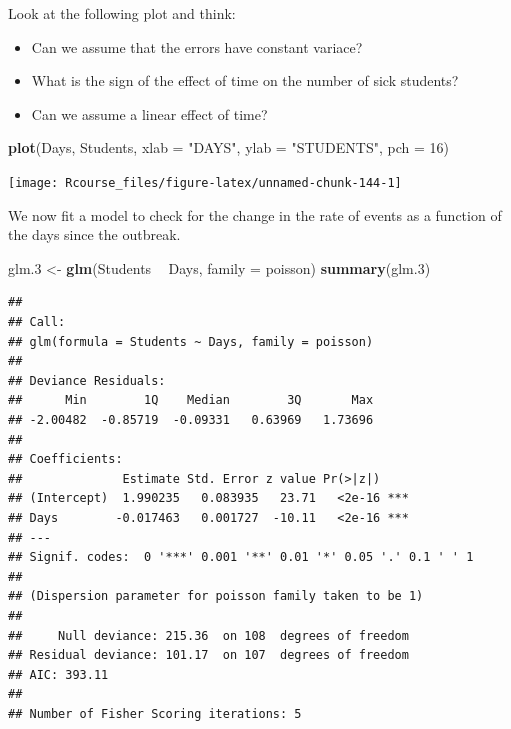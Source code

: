 \documentclass[]{book}
\newenvironment{Shaded}{\begin{snugshade}}{\end{snugshade}}
\newcommand{\KeywordTok}[1]{\textcolor[rgb]{0.13,0.29,0.53}{\textbf{#1}}}
\newcommand{\DataTypeTok}[1]{\textcolor[rgb]{0.13,0.29,0.53}{#1}}
\newcommand{\DecValTok}[1]{\textcolor[rgb]{0.00,0.00,0.81}{#1}}
\newcommand{\StringTok}[1]{\textcolor[rgb]{0.31,0.60,0.02}{#1}}
\newcommand{\OperatorTok}[1]{\textcolor[rgb]{0.81,0.36,0.00}{\textbf{#1}}}
\newcommand{\NormalTok}[1]{#1}
\providecommand{\tightlist}{%
  \setlength{\itemsep}{0pt}\setlength{\parskip}{0pt}}
\theoremstyle{definition}
\theoremstyle{definition}
\theoremstyle{definition}
\theoremstyle{remark}
\begin{document}
Look at the following plot and think:

\begin{itemize}
\tightlist
\item
  Can we assume that the errors have constant variace?
\item
  What is the sign of the effect of time on the number of sick students?
\item
  Can we assume a linear effect of time?
\end{itemize}

\begin{Shaded}
\begin{Highlighting}[]
\KeywordTok{plot}\NormalTok{(Days, Students, }\DataTypeTok{xlab =} \StringTok{"DAYS"}\NormalTok{, }\DataTypeTok{ylab =} \StringTok{"STUDENTS"}\NormalTok{, }\DataTypeTok{pch =} \DecValTok{16}\NormalTok{)}
\end{Highlighting}
\end{Shaded}

\texttt{[image: Rcourse\_files/figure-latex/unnamed-chunk-144-1]}

We now fit a model to check for the change in the rate of events as a
function of the days since the outbreak.

\begin{Shaded}
\begin{Highlighting}[]
\NormalTok{glm.}\DecValTok{3}\NormalTok{ <-}\StringTok{ }\KeywordTok{glm}\NormalTok{(Students }\OperatorTok{~}\StringTok{ }\NormalTok{Days, }\DataTypeTok{family =}\NormalTok{ poisson)}
\KeywordTok{summary}\NormalTok{(glm.}\DecValTok{3}\NormalTok{)}
\end{Highlighting}
\end{Shaded}

\begin{verbatim}
## 
## Call:
## glm(formula = Students ~ Days, family = poisson)
## 
## Deviance Residuals: 
##      Min        1Q    Median        3Q       Max  
## -2.00482  -0.85719  -0.09331   0.63969   1.73696  
## 
## Coefficients:
##              Estimate Std. Error z value Pr(>|z|)    
## (Intercept)  1.990235   0.083935   23.71   <2e-16 ***
## Days        -0.017463   0.001727  -10.11   <2e-16 ***
## ---
## Signif. codes:  0 '***' 0.001 '**' 0.01 '*' 0.05 '.' 0.1 ' ' 1
## 
## (Dispersion parameter for poisson family taken to be 1)
## 
##     Null deviance: 215.36  on 108  degrees of freedom
## Residual deviance: 101.17  on 107  degrees of freedom
## AIC: 393.11
## 
## Number of Fisher Scoring iterations: 5
\end{verbatim}
\end{document}
